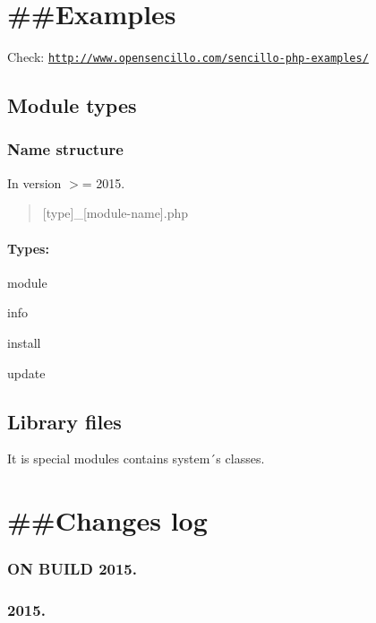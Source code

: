 \section*{\#\#\-Examples }

Check\-: \href{http://www.opensencillo.com/sencillo-php-examples/}{\tt http\-://www.\-opensencillo.\-com/sencillo-\/php-\/examples/}

\subsection*{Module types}

\subsubsection*{Name structure}

In version $>$= 2015. \begin{quotation}
\mbox{[}type\mbox{]}\-\_\-\mbox{[}module-\/name\mbox{]}.php

\end{quotation}


\paragraph*{Types\-:}


\begin{DoxyItemize}
\item module
\item info
\item install
\item update
\end{DoxyItemize}

\subsection*{Library files}

It is special modules contains system´s classes.

\section*{\#\#\-Changes log }

\subsubsection*{O\-N B\-U\-I\-L\-D 2015.}

\subsubsection*{2015.}

